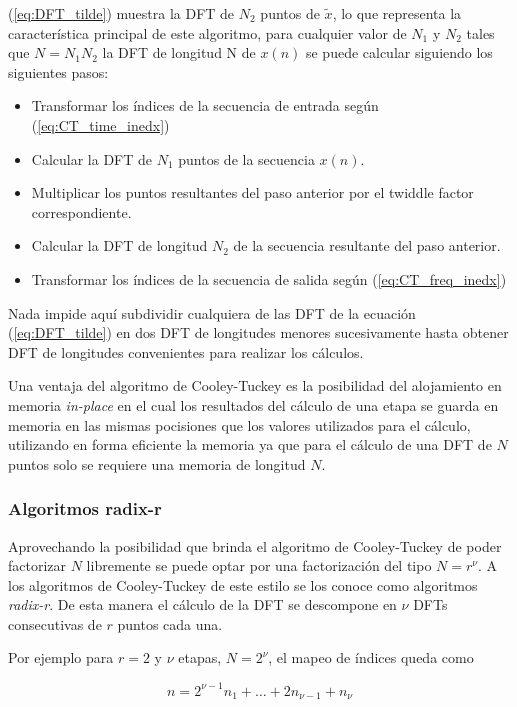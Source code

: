 (\ref{eq:DFT_tilde}) muestra la DFT de $N_2$ puntos de $\tilde{x}$, lo que
representa la característica principal de este algoritmo, para cualquier valor de $N_1$ y $N_2$ tales que $N=N_1N_2$ la
DFT de longitud N de $x(n)$ se puede calcular siguiendo los siguientes pasos:

\begin{itemize}
  \item Transformar los índices de la secuencia de entrada según
  (\ref{eq:CT_time_inedx})
  \item Calcular la DFT de $N_1$ puntos de la secuencia $x(n)$.
  \item Multiplicar los puntos resultantes del paso anterior por el twiddle
  factor correspondiente.
  \item Calcular la DFT de longitud $N_2$ de la secuencia resultante del paso
  anterior.
  \item Transformar los índices de la secuencia de salida según
  (\ref{eq:CT_freq_inedx})
\end{itemize}

Nada impide aquí subdividir cualquiera de las DFT de la ecuación
(\ref{eq:DFT_tilde}) en dos DFT de longitudes menores sucesivamente hasta
obtener DFT de longitudes convenientes para realizar los cálculos.

Una ventaja del algoritmo de Cooley-Tuckey es la posibilidad del alojamiento en memoria
\textit{in-place} en el cual los resultados del cálculo de una etapa se guarda en memoria en las
mismas pocisiones que los valores utilizados para el cálculo, utilizando en forma eficiente la
memoria ya que para el cálculo de una DFT de $N$ puntos solo se requiere una memoria de longitud
$N$.

\subsubsection{Algoritmos radix-r}

Aprovechando la posibilidad que brinda el algoritmo de Cooley-Tuckey de poder factorizar $N$
libremente se puede optar por una factorización del tipo $N=r^\nu$. A los algoritmos de
Cooley-Tuckey de este estilo se los conoce como algoritmos \textit{radix-r}.
De esta manera el cálculo de la DFT se descompone en $\nu$ DFTs consecutivas de $r$ puntos cada una.

Por ejemplo para $r=2$ y $\nu$ etapas, $N=2^\nu$, el mapeo de índices queda como

\begin{equation}
n = 2^{\nu-1}n_{1}+\ldots+2n_{\nu-1}+n_{\nu}
\label{eq:radix2_n}
\end{equation}

